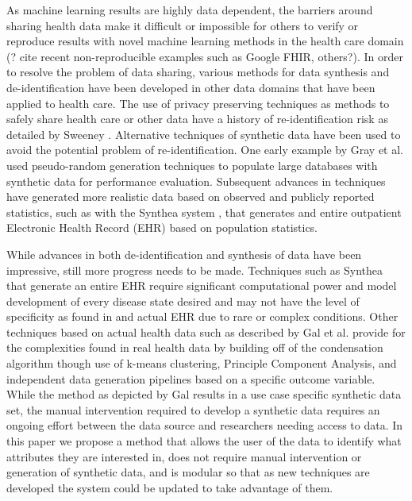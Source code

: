  As machine learning results are highly data dependent, the barriers around sharing health data make it difficult or impossible for others to verify or reproduce results with novel machine learning methods in the health care domain (? cite recent non-reproducible examples such as Google FHIR, others?). In order to resolve the problem of data sharing, various methods for data synthesis and de-identification have been developed in other data domains that have been applied to health care. The use of privacy preserving techniques as methods to safely share health care or other data have a history of re-identification risk as detailed by Sweeney \cite{sweeney_2002}. Alternative techniques of synthetic data have been used to avoid the potential problem of re-identification. One early example by Gray et al. \cite{gray_quickly_1994} used pseudo-random generation techniques to populate large databases with synthetic data for performance evaluation. Subsequent advances in techniques have generated more realistic data based on observed and publicly reported statistics, such as with the Synthea system \cite{walonoski_synthea:_2018}, that generates and entire outpatient Electronic Health Record (EHR) based on population statistics. 
 
 While advances in both de-identification and synthesis of data have been impressive, still more progress needs to be made. Techniques such as Synthea that generate an entire EHR require significant computational power and model development of every disease state desired and may not have the level of specificity as found in and actual EHR due to rare or complex conditions. Other techniques based on actual health data such as described by Gal et al. \cite{gal_data_2014} provide for the complexities found in real health data by building off of the condensation algorithm \cite{aggarwal_static_2008} though use of k-means clustering, Principle Component Analysis, and independent data generation pipelines based on a specific outcome variable. While the method as depicted by Gal results in a use case specific synthetic data set, the manual intervention required to develop a synthetic data requires an ongoing effort between the data source and researchers needing access to data. In this paper we propose a method that allows the user of the data to identify what attributes they are interested in, does not require manual intervention or generation of synthetic data, and is modular so that as new techniques are developed the system could be updated to take advantage of them.
 